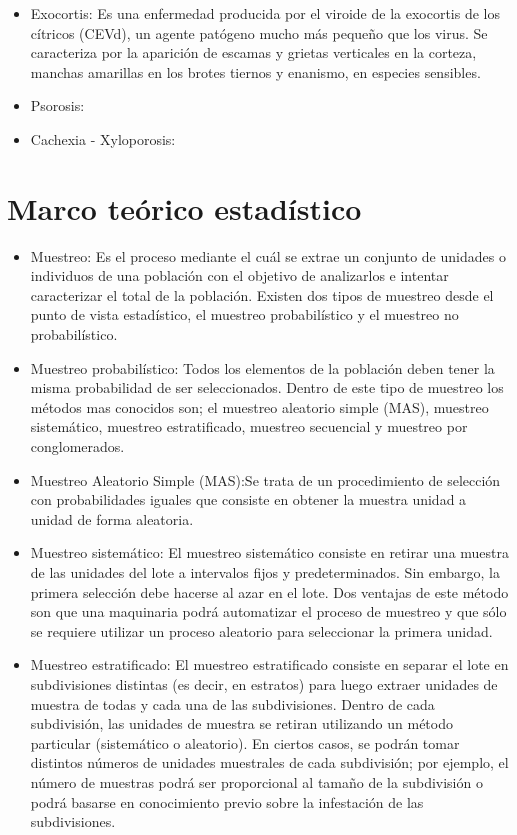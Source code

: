 \begin{itemize}
\item Exocortis: Es una enfermedad producida por el viroide de la exocortis de los c\'{i}tricos (CEVd), un agente pat\'{o}geno mucho m\'{a}s peque\~{n}o que los virus. Se caracteriza por la aparici\'{o}n de escamas y grietas verticales en la corteza, manchas amarillas en los brotes tiernos y enanismo, en especies sensibles.\cite{EXO}
\item Psorosis:
\item Cachexia - Xyloporosis:
\end{itemize}

\section{Marco te\'{o}rico estad\'{i}stico}
\begin{itemize}
\item Muestreo: Es el proceso mediante el cu\'{a}l se extrae un conjunto de unidades o individuos de una poblaci\'{o}n con el objetivo de analizarlos e intentar caracterizar el total de la poblaci\'{o}n. Existen dos tipos de muestreo desde el punto de vista estad\'{i}stico, el muestreo probabil\'{i}stico y el muestreo no probabil\'{i}stico.
\item Muestreo probabil\'{i}stico: Todos los elementos de la poblaci\'{o}n deben tener la misma probabilidad de ser seleccionados. Dentro de este tipo de muestreo los m\'{e}todos mas conocidos son; el muestreo aleatorio simple (MAS), muestreo sistem\'{a}tico, muestreo estratificado, muestreo secuencial y muestreo por conglomerados.
\item Muestreo Aleatorio Simple (MAS):Se trata de un procedimiento de selecci\'{o}n con probabilidades iguales que consiste en obtener la muestra unidad a unidad de forma aleatoria.\cite{M}
\item Muestreo sistem\'{a}tico: El muestreo sistem\'{a}tico consiste en retirar una muestra de las unidades del lote a intervalos fijos y predeterminados. Sin embargo, la primera selecci\'{o}n debe hacerse al azar en el lote. Dos ventajas de este m\'{e}todo son que una maquinaria podr\'{a} automatizar el proceso de muestreo y que s\'{o}lo se requiere utilizar un proceso aleatorio para seleccionar la primera unidad.\cite{MUES}
\item Muestreo estratificado: El muestreo estratificado consiste en separar el lote en subdivisiones distintas (es decir, en estratos) para luego extraer
unidades de muestra de todas y cada una de las subdivisiones. Dentro de cada subdivisi\'{o}n, las unidades de muestra se retiran utilizando un m\'{e}todo particular (sistem\'{a}tico o aleatorio). En ciertos casos, se podr\'{a}n tomar distintos n\'{u}meros de unidades muestrales de cada subdivisi\'{o}n; por ejemplo, el n\'{u}mero de muestras podr\'{a} ser proporcional al tama\~{n}o de la subdivisi\'{o}n o podr\'{a} basarse en conocimiento previo sobre la infestaci\'{o}n de las subdivisiones.\cite{MUES}

\end{itemize}
